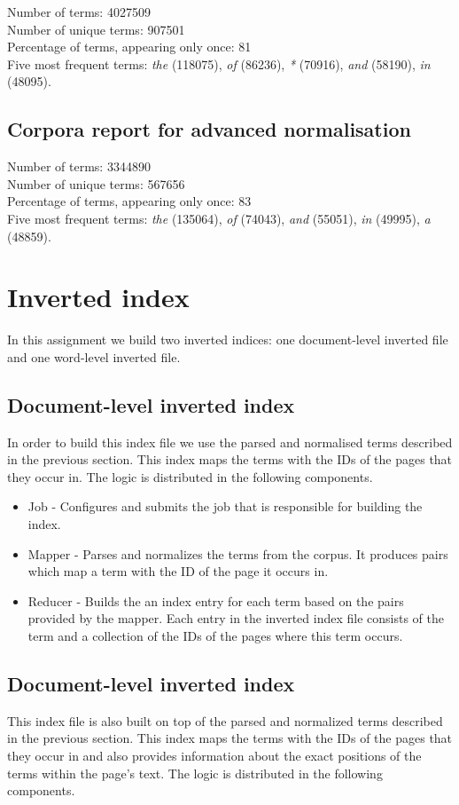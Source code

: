 \documentclass[a4paper, notitlepage]{report}
\begin{document}
Number of terms: 4027509\\
Number of unique terms: 907501\\
Percentage of terms, appearing only once: 81\\
Five most frequent terms: \emph{the} (118075), \emph{of} (86236), \emph{*} (70916), \emph{and} (58190), \emph{in} (48095).


\subsection{Corpora report for advanced normalisation}

Number of terms: 3344890\\
Number of unique terms: 567656\\
Percentage of terms, appearing only once: 83\\
Five most frequent terms: \emph{the} (135064), \emph{of} (74043), \emph{and} (55051), \emph{in} (49995), \emph{a} (48859).

\section{Inverted index}
In this assignment we build two inverted indices: one document-level inverted file and one word-level inverted file.

\subsection{Document-level inverted index}
In order to build this index file we use the parsed and normalised terms described in the previous section. This index maps the terms with the IDs of the pages that they occur in. The logic is distributed in the following components.

\begin{itemize}
	\item Job - Configures and submits the job that is responsible for building the index.
	\item Mapper - Parses and normalizes the terms from the corpus. It produces pairs which map a term with the ID of the page it occurs in.
	\item Reducer - Builds the an index entry for each term based on the pairs provided by the mapper. Each entry in the inverted index file consists of the term and a collection of the IDs of the pages where this term occurs.  
\end{itemize}

\subsection{Document-level inverted index}
This index file is also built on top of the parsed and normalized terms described in the previous section. This index maps the terms with the IDs of the pages that they occur in and also provides information about the exact positions of the terms within the page's text. The logic is distributed in the following components.
\end{document}
